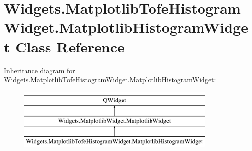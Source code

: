 \hypertarget{classWidgets_1_1MatplotlibTofeHistogramWidget_1_1MatplotlibHistogramWidget}{\section{Widgets.\-Matplotlib\-Tofe\-Histogram\-Widget.\-Matplotlib\-Histogram\-Widget Class Reference}
\label{classWidgets_1_1MatplotlibTofeHistogramWidget_1_1MatplotlibHistogramWidget}
}
Inheritance diagram for Widgets.\-Matplotlib\-Tofe\-Histogram\-Widget.\-Matplotlib\-Histogram\-Widget\-:\begin{figure}[H]
\begin{center}
\leavevmode
\includegraphics[height=3.000000cm]{classWidgets_1_1MatplotlibTofeHistogramWidget_1_1MatplotlibHistogramWidget}
\end{center}
\end{figure}
